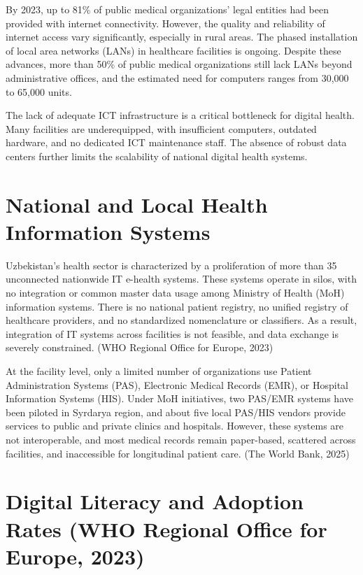 By 2023, up to 81\% of public medical organizations' legal entities had
been provided with internet connectivity. However, the quality and
reliability of internet access vary significantly, especially in rural
areas. The phased installation of local area networks (LANs) in
healthcare facilities is ongoing. Despite these advances, more than 50\%
of public medical organizations still lack LANs beyond administrative
offices, and the estimated need for computers ranges from 30,000 to
65,000 units.

The lack of adequate ICT infrastructure is a critical bottleneck for
digital health. Many facilities are underequipped, with insufficient
computers, outdated hardware, and no dedicated ICT maintenance staff.
The absence of robust data centers further limits the scalability of
national digital health systems.

\section{National and Local Health Information Systems}\label{national-and-local-health-information-systems}

Uzbekistan's health sector is characterized by a proliferation of more
than 35 unconnected nationwide IT e-health systems. These systems
operate in silos, with no integration or common master data usage among
Ministry of Health (MoH) information systems. There is no national
patient registry, no unified registry of healthcare providers, and no
standardized nomenclature or classifiers. As a result, integration of IT
systems across facilities is not feasible, and data exchange is severely
constrained. (WHO Regional Office for Europe, 2023)

At the facility level, only a limited number of organizations use
Patient Administration Systems (PAS), Electronic Medical Records (EMR),
or Hospital Information Systems (HIS). Under MoH initiatives, two
PAS/EMR systems have been piloted in Syrdarya region, and about five
local PAS/HIS vendors provide services to public and private clinics and
hospitals. However, these systems are not interoperable, and most
medical records remain paper-based, scattered across facilities, and
inaccessible for longitudinal patient care. (The World Bank, 2025)

\section{Digital Literacy and Adoption Rates (WHO Regional Office for Europe, 2023)}\label{digital-literacy-and-adoption-rates-who-regional-office-for-europe-2023}

